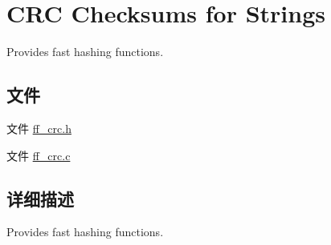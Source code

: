 \hypertarget{group___c_r_c}{}\section{C\+RC Checksums for Strings}
\label{group___c_r_c}


Provides fast hashing functions.  


\subsection*{文件}
\begin{DoxyCompactItemize}
\item 
文件 \hyperlink{ff__crc_8h}{ff\+\_\+crc.\+h}
\item 
文件 \hyperlink{ff__crc_8c}{ff\+\_\+crc.\+c}
\end{DoxyCompactItemize}


\subsection{详细描述}
Provides fast hashing functions. 

